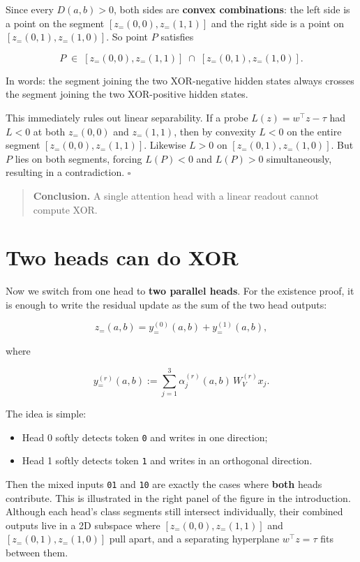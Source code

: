 \documentclass[
  11pt,
]{article}
\providecommand{\tightlist}{%
  \setlength{\itemsep}{0pt}\setlength{\parskip}{0pt}}
\begin{document}
Since every \(D(a,b) > 0\), both sides are \textbf{convex combinations}:
the left side is a point on the segment \([z_=(0,0), z_=(1,1)]\) and the
right side is a point on \([z_=(0,1), z_=(1,0)]\). So point \(P\)
satisfies

\[
P \;\in\; [z_=(0,0), z_=(1,1)] \;\cap\; [z_=(0,1), z_=(1,0)].
\]

In words: the segment joining the two XOR-negative hidden states always
crosses the segment joining the two XOR-positive hidden states.

This immediately rules out linear separability. If a probe
\(L(z) = w^\top z - \tau\) had \(L < 0\) at both \(z_=(0,0)\) and
\(z_=(1,1)\), then by convexity \(L < 0\) on the entire segment
\([z_=(0,0), z_=(1,1)]\). Likewise \(L > 0\) on
\([z_=(0,1), z_=(1,0)]\). But \(P\) lies on both segments, forcing
\(L(P) < 0\) and \(L(P) > 0\) simultaneously, resulting in a
contradiction. \(\square\)

\begin{quote}
\textbf{Conclusion.} A single attention head with a linear readout
cannot compute XOR.
\end{quote}

\section{Two heads can do XOR}\label{two-heads-can-do-xor}

Now we switch from one head to \textbf{two parallel heads}. For the
existence proof, it is enough to write the residual update as the sum of
the two head outputs:

\[
z_=(a,b)=y_=^{(0)}(a,b)+y_=^{(1)}(a,b),
\]

where

\[
y_=^{(r)}(a,b):=\sum_{j=1}^3 \alpha_j^{(r)}(a,b)\,W_V^{(r)}x_j.
\]

The idea is simple:

\begin{itemize}
\tightlist
\item
  Head 0 softly detects token \texttt{0} and writes in one direction;
\item
  Head 1 softly detects token \texttt{1} and writes in an orthogonal
  direction.
\end{itemize}

Then the mixed inputs \texttt{01} and \texttt{10} are exactly the cases
where \textbf{both} heads contribute. This is illustrated in the right
panel of the figure in the introduction. Although each head's class
segments still intersect individually, their combined outputs live in a
2D subspace where \([z_=(0,0), z_=(1,1)]\) and \([z_=(0,1), z_=(1,0)]\)
pull apart, and a separating hyperplane \(w^\top z = \tau\) fits between
them.
\end{document}
